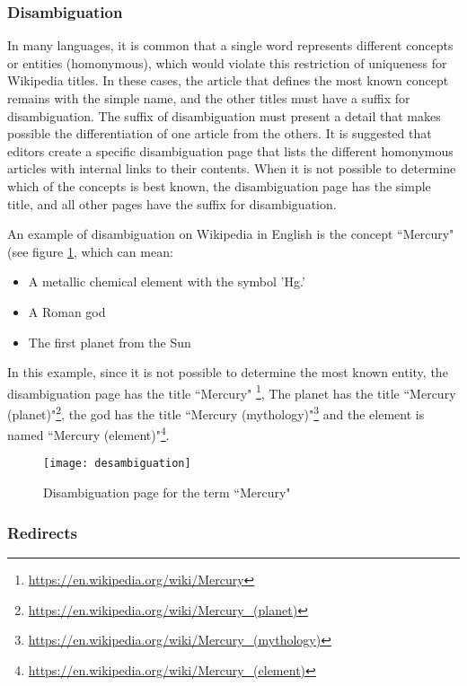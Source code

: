 \subsubsection{\hspace*{3pt}Disambiguation}

In many languages, it is common that a single word represents different concepts or entities (homonymous), which would violate this restriction of uniqueness for Wikipedia titles. In these cases, the article that defines the most known concept remains with the simple name, and the other titles must have a suffix for disambiguation. The suffix of disambiguation must present a detail that makes possible the differentiation of one article from the others. It is suggested that editors create a specific disambiguation page that lists the different homonymous articles with internal links to their contents. When it is not possible to determine which of the concepts is best known, the disambiguation page has the simple title, and all other pages have the suffix for disambiguation.


An example of disambiguation on Wikipedia in English is the concept ``Mercury" (see figure \ref{fig:mercury-desambiguation}, which can mean:

 \begin {itemize}
 \item A metallic chemical element with the symbol 'Hg.'
 \item A Roman god
 \item The first planet from the Sun
 \end {itemize}


 In this example, since it is not possible to determine the most known entity,  the disambiguation page has the title ``Mercury" \footnote{\url{https://en.wikipedia.org/wiki/Mercury}}, The planet has the title ``Mercury (planet)"\footnote{\url{https://en.wikipedia.org/wiki/Mercury_(planet)}}, the god has the title ``Mercury (mythology)"\footnote{\url{https://en.wikipedia.org/wiki/Mercury_(mythology)}} and the element is named ``Mercury (element)"\footnote{\url{https://en.wikipedia.org/wiki/Mercury_(element)}}.

\begin{figure}[!h]
\centering
  \texttt{[image: desambiguation]}
  \caption{Disambiguation page for the term ``Mercury"}
  \label{fig:mercury-desambiguation}
\end{figure}


\subsubsection{\hspace*{3pt} Redirects}

